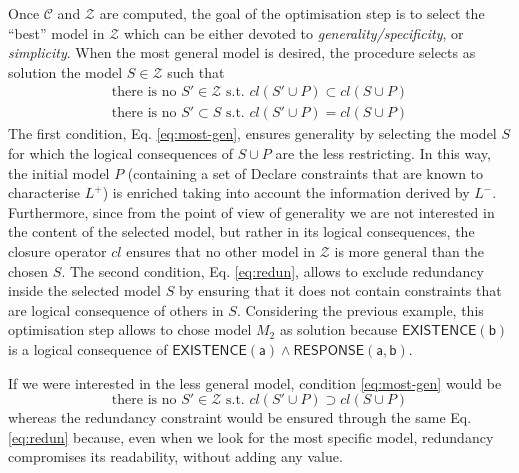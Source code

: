 \documentclass[a4wide,11pt]{article}
\theoremstyle{definition}
\theoremstyle{plain}
\begin{document}
Once $\mathcal{C}$ and $\mathcal{Z}$ are computed, the goal of the optimisation step is to select the ``best'' model in $\mathcal{Z}$ which can be either devoted to \emph{generality/specificity}, or \emph{simplicity}.
When the most general model is desired, the procedure selects as solution the model $S\in \mathcal{Z}$ such that 
\begin{subequations}
  \begin{align}
    \text{there is no $S'\in\mathcal{Z}$ s.t. } cl(S'\cup P)\subset cl(S\cup P) \label{eq:most-gen}\\
    \text{there is no $S'\subset S$ s.t. } cl(S'\cup P)=cl(S\cup P)\label{eq:redun}
  \end{align}
\end{subequations}
%
The first condition, Eq. \eqref{eq:most-gen}, ensures generality by selecting the model $S$ for which the logical consequences of $S\cup P$ are the less restricting. 
In this way, the initial model $P$ (containing a set of Declare constraints that are known to characterise $L^+$) is enriched taking into account the information derived by $L^-$.
Furthermore, since from the point of view of generality we are not interested in the content of the selected model, but rather in its logical consequences, the closure operator $cl$ ensures that no other model in $\mathcal{Z}$ is more general than the chosen $S$. 
%
The second condition, Eq. \eqref{eq:redun}, allows to exclude redundancy inside the selected model $S$ by ensuring that it does not contain constraints that are logical consequence of others in $S$. Considering the previous example, this optimisation step allows to chose model $M_2$ as solution because $\mathsf{EXISTENCE(b)}$ is a logical consequence of $\mathsf{EXISTENCE(a)} \land  \mathsf{RESPONSE(a,b)}$.

If we were interested in the less general model, condition \eqref{eq:most-gen} would be 
\begin{equation}\label{eq:most-spe}
\text{there is no $S'\in\mathcal{Z}$ s.t. } cl(S'\cup P)\supset cl(S\cup P)
\end{equation}
whereas the redundancy constraint would be ensured through the same Eq. \eqref{eq:redun} because, even when we look for the most specific model, redundancy compromises its readability, without adding any value.
\end{document}
